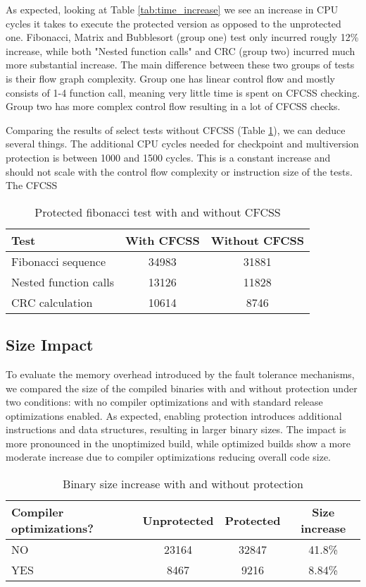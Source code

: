 As expected, looking at Table \ref{tab:time_increase} we see an increase in CPU cycles it takes to execute the protected version as opposed to the unprotected one. Fibonacci, Matrix and Bubblesort (group one) test only incurred rougly 12\% increase, while both "Nested function calls" and CRC (group two) incurred much more substantial increase. The main difference between these two groups of tests is their flow graph complexity. Group one has linear control flow and mostly consists of 1-4 function call, meaning very little time is spent on CFCSS checking. Group two has more complex control flow resulting in a lot of CFCSS checks.

Comparing the results of select tests without CFCSS (Table \ref{tab:cfcss_nocfcss}), we can deduce several things. The additional CPU cycles needed for checkpoint and multiversion protection is between 1000 and 1500 cycles. This is a constant increase and should not scale with the control flow complexity or instruction size of the tests. The CFCSS 

\begin{table}[h]
\centering
\begin{tabular}{|l|c|c|}
\hline
\textbf{Test} & \textbf{With CFCSS} & \textbf{Without CFCSS} \\
\hline
Fibonacci sequence & 34983 & 31881 \\
Nested function calls & 13126 & 11828 \\
CRC calculation & 10614 & 8746 \\

\hline
\end{tabular}
\caption{Protected fibonacci test with and without CFCSS}
\label{tab:cfcss_nocfcss}
\end{table}

\subsection{Size Impact}

To evaluate the memory overhead introduced by the fault tolerance mechanisms, we compared the size of the compiled binaries with and without protection under two conditions: with no compiler optimizations and with standard release optimizations enabled. As expected, enabling protection introduces additional instructions and data structures, resulting in larger binary sizes. The impact is more pronounced in the unoptimized build, while optimized builds show a more moderate increase due to compiler optimizations reducing overall code size.

\begin{table}[!h]
\centering
\begin{tabular}{|l|c|c|c|}
\hline
\textbf{Compiler optimizations?} & \textbf{Unprotected} & \textbf{Protected} & \textbf{Size increase} \\
\hline
NO  & 23164 & 32847 & 41.8\% \\
YES & 8467 & 9216 & 8.84\% \\
\hline
\end{tabular}
\caption{Binary size increase with and without protection}
\end{table}

